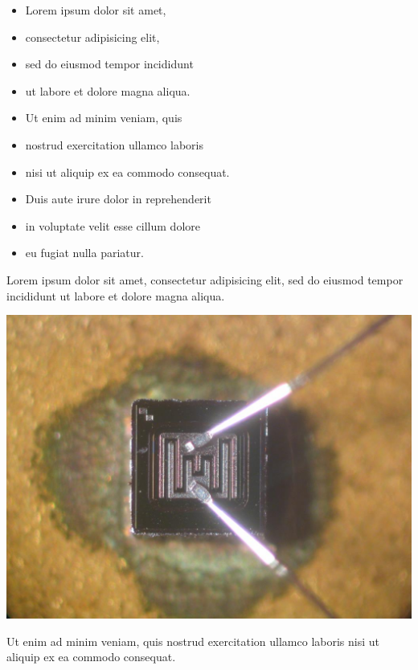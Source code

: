 {
\begin{itemize}
\item Lorem ipsum dolor sit amet,
\item consectetur adipisicing elit,
\item sed do eiusmod tempor incididunt
\item ut labore et dolore magna aliqua.
\item Ut enim ad minim veniam, quis
\item nostrud exercitation ullamco laboris
\item nisi ut aliquip ex ea commodo consequat.
\item Duis aute irure dolor in reprehenderit
\item in voluptate velit esse cillum dolore
\item eu fugiat nulla pariatur.
\end{itemize}
\pause

}


{
Lorem ipsum dolor sit amet, consectetur adipisicing elit, sed do eiusmod tempor incididunt ut labore et dolore magna aliqua.

\begin{center}
\includegraphics[scale=0.1]{pic/transistor}
\end{center}

Ut enim ad minim veniam, quis nostrud exercitation ullamco laboris nisi ut aliquip ex ea commodo consequat.
}


